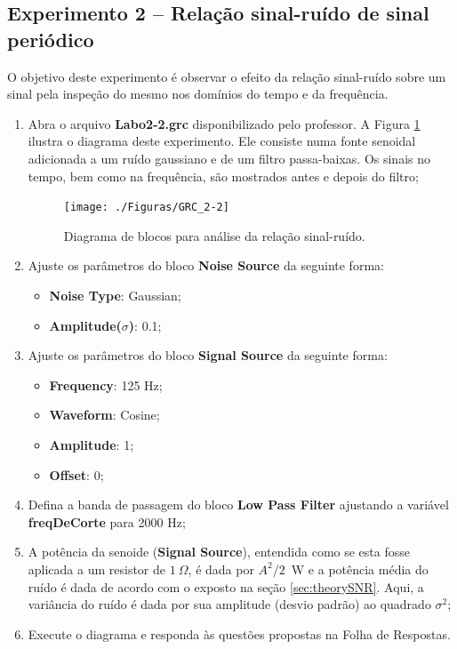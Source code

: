 \documentclass[12pt,addpoints]{exam}
\begin{document}
\subsection{Experimento 2 -- Relação sinal-ruído de sinal periódico}

O objetivo deste experimento é observar o efeito da relação sinal-ruído sobre um sinal pela inspeção do mesmo nos domínios do tempo e da frequência.

\begin{enumerate}
    \item Abra o arquivo \textbf{Labo2-2.grc} disponibilizado pelo professor. A Figura \ref{fig:GRC_2-2a} ilustra o diagrama deste experimento. Ele consiste numa fonte senoidal adicionada a um ruído gaussiano e de um filtro passa-baixas. Os sinais no tempo, bem como na frequência, são mostrados antes e depois do filtro;
    \begin{figure}[htb]
        \centering
        \texttt{[image: ./Figuras/GRC\_2-2]}
        \caption{Diagrama de blocos para análise da relação sinal-ruído.} 
        \label{fig:GRC_2-2a}
    \end{figure}
    \item Ajuste os parâmetros do bloco \textbf{Noise Source} da seguinte forma:
    \begin{itemize}
        \item \textbf{Noise Type}: Gaussian;
        \item \textbf{Amplitude($\sigma$)}: 0.1;
    \end{itemize}
    \item Ajuste os parâmetros do bloco \textbf{Signal Source} da seguinte forma:
    \begin{itemize}
        \item \textbf{Frequency}: 125 Hz;
        \item \textbf{Waveform}: Cosine;
        \item \textbf{Amplitude}: 1;
        \item \textbf{Offset}: 0;
    \end{itemize}
    \item Defina a banda de passagem do bloco \textbf{Low Pass Filter} ajustando a variável \textbf{freqDeCorte} para 2000 Hz;
    \item A potência da senoide (\textbf{Signal Source}), entendida como se esta fosse aplicada a um resistor de $1~\Omega$, é dada por $A^2/2$~W e a potência média do ruído é dada de acordo com o exposto na seção \ref{sec:theorySNR}. Aqui, a variância do ruído é dada por sua amplitude (desvio padrão) ao quadrado $\sigma^2$;
    \item Execute o diagrama e responda às questões propostas na Folha de Respostas.
\end{enumerate}
\end{document}
